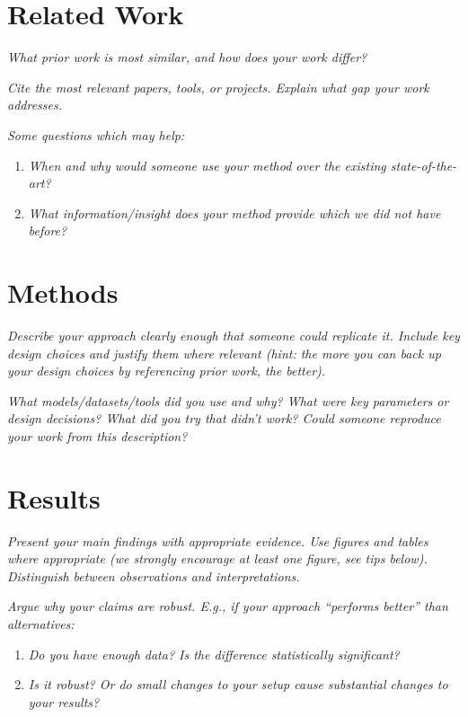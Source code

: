 \documentclass[11pt,letterpaper]{article}
\newcommand{\guide}[1]{\textit{#1}}
\begin{document}
\section{Related Work}

\guide{What prior work is most similar, and how does your work differ?}

\guide{Cite the most relevant papers, tools, or projects. Explain what gap your
work addresses.}

\guide{Some questions which may help:}
\begin{enumerate}[label=(\alph*)]
  \item \guide{When and why would someone use your method over the existing
        state-of-the-art?}
  \item \guide{What information/insight does your method provide which we did
        not have before?}
\end{enumerate}

\section{Methods}

\guide{Describe your approach clearly enough that someone could replicate it.
Include key design choices and justify them where relevant (hint: the more you
can back up your design choices by referencing prior work, the better).}

\guide{What models/datasets/tools did you use and why? What were key parameters
or design decisions? What did you try that didn't work? Could someone reproduce
your work from this description?}

\section{Results}

\guide{Present your main findings with appropriate evidence. Use figures and
tables where appropriate (we strongly encourage at least one figure, see tips
below). Distinguish between observations and interpretations.}

\guide{Argue why your claims are robust. E.g., if your approach ``performs
better'' than alternatives:}
\begin{enumerate}[label=(\alph*)]
  \item \guide{Do you have enough data? Is the difference statistically
        significant?}
  \item \guide{Is it robust? Or do small changes to your setup cause substantial
        changes to your results?}
\end{enumerate}
\end{document}
